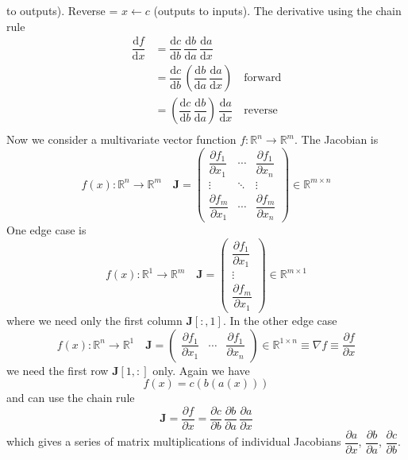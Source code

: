 \documentclass[paper=a4,11pt,headsepline]{scrartcl}
\newcommand{\ve}[1]{\ensuremath{\bm{\mathit{#1}}}}
\newcommand{\ma}[1]{\ensuremath{\bm{\mathbf{#1}}}}
\newcommand{\dd}{\text{d}}
\newcommand{\ra}{\rightarrow}
\newcommand{\la}{\leftarrow}
\newcommand{\pd}[2]{\dfrac{\partial #1}{\partial #2}}
\newcommand{\td}[2]{\dfrac{\dd #1}{\dd #2}}
\begin{document}
to outputs). Reverse = $x \la c$ (outputs to inputs).
The derivative using the chain rule
    \begin{align*}
        \td{f}{x}
            &= \td{c}{b}\,\td{b}{a}\,\td{a}{x}\\
            &= \td{c}{b}\,\left(\td{b}{a}\,\td{a}{x}\right)\quad\text{forward}\\
            &= \left(\td{c}{b}\,\td{b}{a}\right)\,\td{a}{x}\quad\text{reverse}\\
    \end{align*}
Now we consider a multivariate vector function $\ve f: \mathbb R^n \ra \mathbb R^m$.
The Jacobian is
$$\ve f(\ve x): \mathbb R^n \ra \mathbb R^m\quad \ma J =
\begin{pmatrix}
\pd{f_1}{x_1} & \cdots & \pd{f_1}{x_n}  \\
\vdots        & \ddots & \vdots         \\
\pd{f_m}{x_1} & \cdots & \pd{f_m}{x_n}
\end{pmatrix}
\in\mathbb R^{m\times n}
$$
One edge case is
$$\ve f(x): \mathbb R^1 \ra \mathbb R^m\quad \ma J =
\begin{pmatrix}
\pd{f_1}{x_1}  \\
\vdots         \\
\pd{f_m}{x_1}
\end{pmatrix}
\in\mathbb R^{m\times 1}
$$
where we need only the first column $\ma J[:,1]$.
In the other edge case
$$f(\ve x): \mathbb R^n \ra \mathbb R^1\quad \ma J =
\begin{pmatrix}
\pd{f_1}{x_1} & \cdots & \pd{f_1}{x_n}
\end{pmatrix}
\in\mathbb R^{1\times n}
\equiv \nabla f\equiv \pd{f}{\ve x}
$$
we need the first row $\ma J[1,:]$ only.
Again we have
$$\ve f(\ve x) = \ve c(\ve b(\ve a(\ve x)))$$
and can use the chain rule
$$\ma J=\pd{\ve f}{\ve x} = \pd{\ve c}{\ve b}\,\pd{\ve b}{\ve a}\,\pd{\ve a}{\ve x}$$
which gives a series of matrix multiplications of individual Jacobians $\pd{\ve
a}{\ve x}$, $\pd{\ve b}{\ve a}$, $\pd{\ve c}{\ve b}$.
\end{document}
